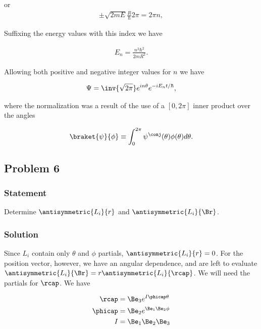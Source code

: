 or
\begin{align*}
\pm \sqrt{2m E} \frac{R}{\hbar} 2\pi = 2 \pi n,
\end{align*}

Suffixing the energy values with this index we have

\begin{align}\label{eqn:desaiCh4:505}
E_n = \frac{n^2 \hbar^2}{2 m R^2}.
\end{align}

Allowing both positive and negative integer values for $n$ we have

\begin{align}\label{eqn:desaiCh4:506}
\Psi = \inv{\sqrt{2\pi}} e^{i n \theta} e^{-i E_n t/\hbar},
\end{align}

where the normalization was a result of the use of a $[0,2\pi]$ inner product over the angles

\begin{align}\label{eqn:desaiCh4:507}
\braket{\psi}{\phi} \equiv \int_0^{2\pi} \psi^\conj(\theta) \phi(\theta) d\theta.
\end{align}

\subsection{Problem 6}
\subsubsection{Statement}

Determine $\antisymmetric{L_i}{r}$ and $\antisymmetric{L_i}{\Br}$.

\subsubsection{Solution}

Since $L_i$ contain only $\theta$ and $\phi$ partials, $\antisymmetric{L_i}{r} = 0$.  For the position vector, however, we have an angular dependence, and are left to evaluate $\antisymmetric{L_i}{\Br} = r \antisymmetric{L_i}{\rcap}$.  We will need the partials for $\rcap$.  We have

\begin{align}\label{eqn:desaiCh4:600}
\rcap &= \Be_3 e^{I \phicap \theta} \\
\phicap &= \Be_2 e^{\Be_1 \Be_2 \phi} \\
I &= \Be_1 \Be_2 \Be_3
\end{align}

